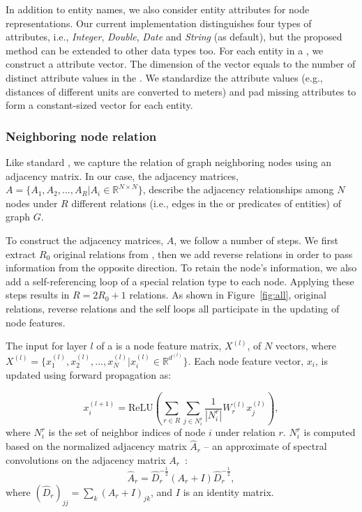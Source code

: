 	
    In addition to entity names, we also consider entity attributes for node representations.
	Our current implementation distinguishes four types of attributes, i.e., \emph{Integer}, \emph{Double}, \emph{Date} and \emph{String}
    (as default), but the proposed method can be extended to other data types too.
%	
	For each entity in a \KG, we construct a attribute vector. The dimension of the vector equals to the number of distinct attribute values in the \KG.
    We standardize the attribute values (e.g., distances of different units are converted to meters) and pad missing attributes to form a constant-sized
    vector for each entity.

 \subsubsection{Neighboring node relation}
 Like standard \RGCNs, we capture the relation of graph neighboring nodes using an adjacency matrix.
 In our case, the adjacency matrices, $A=\{A_1,A_2,...,A_R |A_i \in \mathbb{R}^{N
 \times N} \}$, describe the adjacency relationships among $N$ nodes under $R$ different relations (i.e., edges in the \KG or predicates of entities) of graph $G$.

 To construct the adjacency matrices, $A$, we follow a number of steps. We first extract $R_0$ original
 relations from \KGs, then we add reverse relations in order to pass information from the opposite direction. To retain the node's
 information, we also add a self-referencing loop of a special relation type to each node. Applying these steps results in $R=2R_0+1$ relations. As shown in Figure~\ref{fig:all}, original relations, reverse relations and the self loops all participate in the updating of node features.

 The input for layer $l$ of a \RGCN is a node feature matrix, $X^{(l)}$, of $N$ vectors, where  $X^{(l)} =\{x^{(l)}_1,x^{(l)}_2,...,x^{(l)}_{N}
 |x^{(l)}_{i} \in \mathbb{R}^{d^{(l)}}\}$. Each node feature vector, $x_i$, is updated using forward propagation as:

	\begin{equation}
	x_i^{(l+1)}=\mathrm{ReLU} (\sum\limits_{r \in R}\sum\limits_{j \in N_i^r}\frac{1}{|N_i^r|}W_r^{(l)}x_j^{(l)}),
	\end{equation} where $N_i^r$ is the set of neighbor indices of node $i$ under relation $r$.
    $N_i^r$ is computed based on the normalized adjacency
matrix $\hat A_r$ -- an approximate of spectral convolutions on the adjacency matrix $A_r$~\cite{Kipf2016Semi}:
	\begin{equation}
	\hat A_r=\hat D_r^{- \frac{1}{2}}(A_r+I)\hat D_r^{- \frac{1}{2}},
	\end{equation}
	where $(\hat D_r)_{jj}=\sum_k(A_r+I)_{jk}$, and $I$ is an identity matrix.

